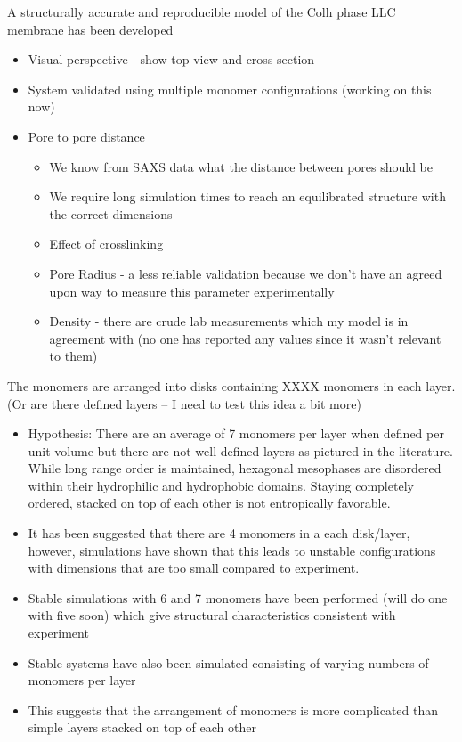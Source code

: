 \documentclass{article}
\begin{document}
	A structurally accurate and reproducible model of the Colh phase LLC membrane has been developed
	\begin{itemize}
		\item Visual perspective - show top view and cross section
		\item System validated using multiple monomer configurations (working on this now)
		\item Pore to pore distance
		\begin{itemize}
			\item We know from SAXS data what the distance between pores should be
			\item We require long simulation times to reach an equilibrated structure with the correct dimensions
			\item Effect of crosslinking
		\item Pore Radius - a less reliable validation because we don't have an agreed upon way to measure this parameter experimentally
		\item Density - there are crude lab measurements which my model is in agreement with (no one has reported any values since it wasn't relevant to them)
		\end{itemize}
	\end{itemize}
	
	The monomers are arranged into disks containing XXXX monomers in each layer. (Or are there defined layers -- I need to test this idea a bit more) 
	\begin{itemize}
		\item Hypothesis: There are an average of 7 monomers per layer when defined per unit volume but there are not well-defined layers as pictured in the literature. While long range order is maintained, hexagonal mesophases are disordered within their hydrophilic and hydrophobic domains. Staying completely ordered, stacked on top of each other is not entropically favorable.
	        \item It has been suggested that there are 4 monomers in a each disk/layer, however, simulations have shown that this leads to unstable configurations with dimensions that are too small compared to experiment.
                \item Stable simulations with 6 and 7 monomers have been performed (will do one with five soon) which give structural characteristics consistent with experiment
                \item Stable systems have also been simulated consisting of varying numbers of monomers per layer
                \item This suggests that the arrangement of monomers is more complicated than simple layers stacked on top of each other
	\end{itemize}
\end{document}
